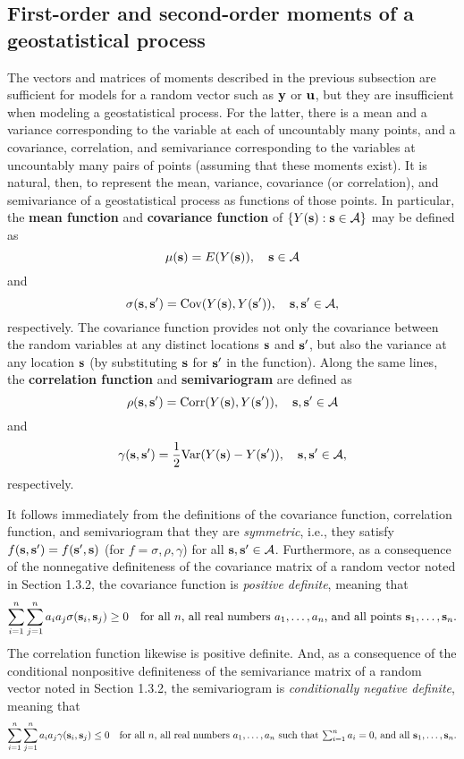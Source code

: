 \subsection{First-order and second-order moments of a geostatistical process}
The vectors and matrices of moments described in the previous subsection are sufficient for models for a random vector such as ${\bf y}$ or ${\bf u}$, but they are insufficient when modeling a geostatistical process.  For the latter, there is a mean and a variance corresponding to the variable at each of uncountably many points, and a covariance, correlation, and semivariance corresponding to the variables at uncountably many pairs of points (assuming that these moments exist).  It is natural, then, to represent the mean, variance, covariance (or correlation), and semivariance of a geostatistical process as functions of those points.  In particular, the {\bf mean function} and {\bf covariance function} of $\{Y({\bf s}):{\bf s}\in{\cal A}\}$ may be defined as
\[ \mu({\bf s})=E(Y({\bf s})), \quad {\bf s}\in{\cal A} \]
and
\[ \sigma({\bf s},{\bf s}')=\mbox{Cov}(Y({\bf s}),Y({\bf s}')),\quad {\bf s},{\bf s}'\in{\cal A}, \]
respectively.  The covariance function provides not only the covariance between the random variables at any distinct locations ${\bf s}$ and ${\bf s}'$, but also the variance at any location ${\bf s}$ (by substituting ${\bf s}$ for ${\bf s}'$ in the function).
Along the same lines, the {\bf correlation function} and {\bf semivariogram} are defined as
\[ \rho({\bf s},{\bf s}')=\mbox{Corr}(Y({\bf s}),Y({\bf s}')), \quad {\bf s},{\bf s}'\in{\cal A} \]
and
\[ \gamma({\bf s},{\bf s}')=\frac{1}{2}\mbox{Var}(Y({\bf s})-Y({\bf s}')),\quad {\bf s},{\bf s}'\in{\cal A}, \]
respectively.

It follows immediately from the definitions of the covariance function, correlation function, and semivariogram that they are {\em symmetric}, i.e., they satisfy $f({\bf s},{\bf s}')=f({\bf s}',{\bf s})$ (for $f=\sigma,\rho,\gamma$) for all ${\bf s},{\bf s}'\in{\cal A}$.  Furthermore, as a consequence of the nonnegative definiteness of the covariance matrix of a random vector noted in Section 1.3.2, the covariance function is {\em positive definite}, meaning that
\begin{equation}\label{defnpositivedefinitefn}
\sum_{i=1}^{n}\sum_{j=1}^{n}a_ia_j\sigma({\bf s}_i,{\bf s}_j)\geq 0\quad\mbox{for all $n$, all real numbers $a_1,\ldots,a_n$, and all points ${\bf s}_1,\ldots,{\bf s}_n.$}
\end{equation}
The correlation function likewise is positive definite.  And, as a consequence of the conditional nonpositive definiteness of the semivariance matrix of a random vector noted in Section 1.3.2, the semivariogram is {\em conditionally negative definite}, meaning that
\begin{equation}\label{defncondnegativedefinitefn}
\sum_{i=1}^{n}\sum_{j=1}^{n}a_{i}a_{j}\gamma({\bf s}_{i},{\bf s}_{j})
\leq 0 \quad\mbox{for all $n$, all real numbers $a_{1}, 
\ldots, a_{n}$ such that $\sum_{i=1}^{n}a_{i}=0$, and all ${\bf s}_1,\ldots,{\bf s}_n$}.
\end{equation}

